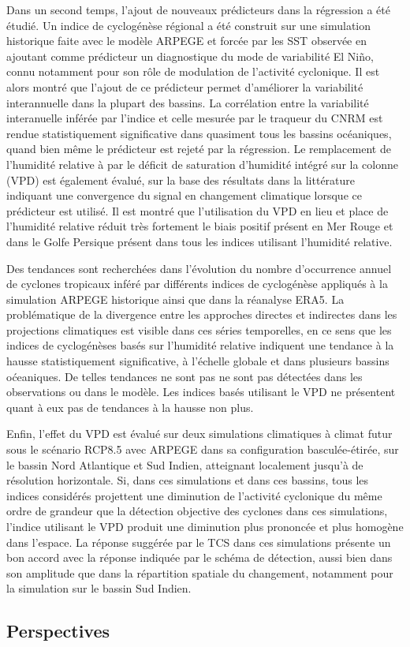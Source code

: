 \documentclass[../main.tex]{subfiles}
\begin{document}
Dans un second temps, l'ajout de nouveaux prédicteurs dans la régression a été étudié. Un indice de cyclogénèse régional a été construit sur une simulation
historique faite avec le modèle ARPEGE et forcée par les SST observée en ajoutant comme prédicteur un diagnostique du mode de variabilité El Niño, connu
notamment pour son rôle de modulation de l'activité cyclonique. Il est alors montré que l'ajout de ce prédicteur permet d'améliorer la variabilité interannuelle
dans la plupart des bassins. La corrélation entre la variabilité interanuelle inférée par l'indice et celle mesurée par le traqueur du CNRM est rendue
statistiquement significative dans quasiment tous les bassins océaniques, quand bien même le prédicteur est rejeté par la régression. Le remplacement de
l'humidité relative à  par le déficit de saturation d'humidité intégré sur la colonne (VPD) est également évalué, sur la base des résultats dans la
littérature indiquant une convergence du signal en changement climatique lorsque ce prédicteur est utilisé. Il est montré que l'utilisation du VPD en lieu et
place de l'humidité relative réduit très fortement le biais positif présent en Mer Rouge et dans le Golfe Persique présent dans tous les indices utilisant
l'humidité relative.

Des tendances sont recherchées dans l'évolution du nombre d'occurrence annuel de cyclones tropicaux inféré par différents indices de cyclogénèse appliqués à la
simulation ARPEGE historique ainsi que dans la réanalyse ERA5. La problématique de la divergence entre les approches directes et indirectes dans les projections
climatiques est visible dans ces séries temporelles, en ce sens que les indices de cyclogénèses basés sur l'humidité relative indiquent une tendance à la hausse
statistiquement significative, à l'échelle globale et dans plusieurs bassins oćeaniques. De telles tendances ne sont pas ne sont pas détectées dans les
observations ou dans le modèle. Les indices basés utilisant le VPD ne présentent quant à eux pas de tendances à la hausse non plus.

Enfin, l'effet du VPD est évalué sur deux simulations climatiques à climat futur sous le scénario RCP8.5 avec ARPEGE dans sa configuration basculée-étirée, sur
le bassin Nord Atlantique et Sud Indien, atteignant localement jusqu'à  de résolution horizontale. Si, dans ces simulations et dans ces bassins, tous les
indices considérés projettent une diminution de l'activité cyclonique du même ordre de grandeur que la détection objective des cyclones dans ces simulations,
l'indice utilisant le VPD produit une diminution plus prononcée et plus homogène dans l'espace. La réponse suggérée par le TCS dans ces simulations présente un
bon accord avec la réponse indiquée par le schéma de détection, aussi bien dans son amplitude que dans la répartition spatiale du changement, notamment pour la
simulation sur le bassin Sud Indien.

\subsection*{Perspectives}
\end{document}
